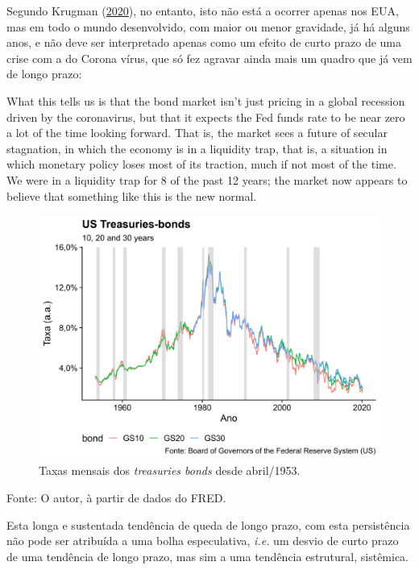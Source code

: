 \documentclass[
	12pt,				%
	oneside,			%
	a4paper,			%
	chapter=TITLE,		%
	section=TITLE,		%
	english,			%
	brazil				%
	]{abntex2}
\newcommand{\bcenter}{\begin{center}}
\newcommand{\ecenter}{\end{center}}
\begin{document}
Segundo Krugman (\protect\hyperlink{ref-krugman2020}{2020}), no entanto, isto não está a ocorrer apenas nos
EUA, mas em todo o mundo desenvolvido, com maior ou menor gravidade, já há
alguns anos, e não deve ser interpretado apenas como um efeito de curto prazo
de uma crise com a do Corona vírus, que só fez agravar ainda mais um quadro
que já vem de longo prazo:
\begin{citacao}
What this tells us is that the bond market isn’t just pricing in a global
recession driven by the coronavirus, but that it expects the Fed funds rate to
be near zero a lot of the time looking forward. That is, the market sees a
future of secular stagnation, in which the economy is in a liquidity trap, that
is, a situation in which monetary policy loses most of its traction, much if not
most of the time. We were in a liquidity trap for 8 of the past 12 years; the
market now appears to believe that something like this is the new normal.
\end{citacao}
\begin{figure}[H]

{\centering \includegraphics[width=\textwidth]{images/fred-1} 

}

\caption{Taxas mensais dos \emph{treasuries bonds} desde abril/1953.}\label{fig:fred}
\end{figure}
\bcenter

Fonte: O autor, à partir de dados do \gls{FRED}.
\ecenter

Esta longa e sustentada tendência de queda de longo prazo, com esta persistência
não pode ser atribuída a uma bolha especulativa, \emph{i.e.} um desvio de curto prazo
de uma tendência de longo prazo, mas sim a uma tendência estrutural, sistêmica.
\end{document}
